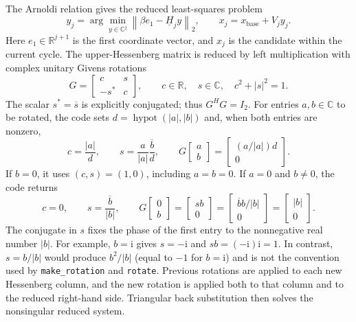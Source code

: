 The Arnoldi relation gives the reduced least-squares problem
\begin{equation}
    y_j = \arg\min_{y\in\mathbb{C}^j}
    \left\lVert \beta e_1-\underline{H}_j y\right\rVert_2,
    \qquad x_j=x_{\mathrm{base}}+V_j y_j.
    \label{eq:least-squares}
\end{equation}
Here $e_1\in\mathbb{R}^{j+1}$ is the first coordinate vector, and $x_j$ is the
candidate within the current cycle. The upper-Hessenberg matrix is reduced by
left multiplication with complex unitary Givens rotations
\begin{equation}
    G = \begin{bmatrix}c&s\\-s^{\ast}&c\end{bmatrix},
    \qquad c\in\mathbb{R},\quad s\in\mathbb{C},\quad c^2+|s|^2=1.
    \label{eq:givens}
\end{equation}
The scalar $s^{\ast}=\overline{s}$ is explicitly conjugated; thus $G^H G=I_2$.
For entries $a,b\in\mathbb{C}$ to be rotated, the code sets
$d=\operatorname{hypot}(|a|,|b|)$ and, when both entries are nonzero,
\begin{equation}
    c=\frac{|a|}{d},\qquad
    s=\frac{a}{|a|}\frac{\overline{b}}{d},\qquad
    G\begin{bmatrix}a\\b\end{bmatrix}
      =\begin{bmatrix}(a/|a|)d\\0\end{bmatrix}.
\end{equation}
If $b=0$, it uses $(c,s)=(1,0)$, including $a=b=0$. If $a=0$ and
$b\ne0$, the code returns
\[
    c=0,\qquad s=\frac{\overline{b}}{|b|},\qquad
    G\begin{bmatrix}0\\b\end{bmatrix}
      =\begin{bmatrix}sb\\0\end{bmatrix}
      =\begin{bmatrix}\overline{b}b/|b|\\0\end{bmatrix}
      =\begin{bmatrix}|b|\\0\end{bmatrix}.
\]
The conjugate in $s$ fixes the phase of the first entry to the nonnegative real
number $|b|$. For example, $b=\mathrm{i}$ gives $s=-\mathrm{i}$ and
$s b=(-\mathrm{i})\mathrm{i}=1$. In contrast, $s=b/|b|$ would produce
$b^2/|b|$ (equal to $-1$ for $b=\mathrm{i}$) and is not the convention used by
\texttt{make\_rotation} and \texttt{rotate}.
Previous rotations are applied to each new Hessenberg column, and the new
rotation is applied both to that column and to the reduced right-hand side.
Triangular back substitution then solves the nonsingular reduced system.

